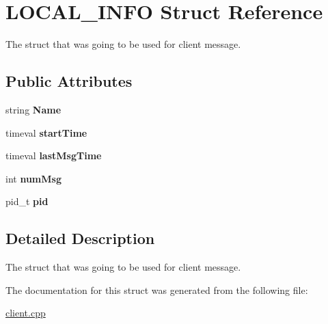 \hypertarget{structLOCAL__INFO}{
\section{LOCAL\_\-INFO Struct Reference}
\label{structLOCAL__INFO}
}


The struct that was going to be used for client message.  
\subsection*{Public Attributes}
\begin{DoxyCompactItemize}
\item 
\hypertarget{structLOCAL__INFO_a160fbf4fec9e19d011e222ae44287f65}{
string {\bfseries Name}}
\label{structLOCAL__INFO_a160fbf4fec9e19d011e222ae44287f65}

\item 
\hypertarget{structLOCAL__INFO_af9cdf8fc401019bb68d6073279f4c248}{
timeval {\bfseries startTime}}
\label{structLOCAL__INFO_af9cdf8fc401019bb68d6073279f4c248}

\item 
\hypertarget{structLOCAL__INFO_ad9fdb22ec768de0b5f5dc6e6da837cff}{
timeval {\bfseries lastMsgTime}}
\label{structLOCAL__INFO_ad9fdb22ec768de0b5f5dc6e6da837cff}

\item 
\hypertarget{structLOCAL__INFO_a880a5e2ed0fe6cad60a3060b0d5ffcb7}{
int {\bfseries numMsg}}
\label{structLOCAL__INFO_a880a5e2ed0fe6cad60a3060b0d5ffcb7}

\item 
\hypertarget{structLOCAL__INFO_a3fa05f286f9dde4c31ab820ad98a2b7d}{
pid\_\-t {\bfseries pid}}
\label{structLOCAL__INFO_a3fa05f286f9dde4c31ab820ad98a2b7d}

\end{DoxyCompactItemize}


\subsection{Detailed Description}
The struct that was going to be used for client message. 

The documentation for this struct was generated from the following file:\begin{DoxyCompactItemize}
\item 
\hyperlink{client_8cpp}{client.cpp}\end{DoxyCompactItemize}
